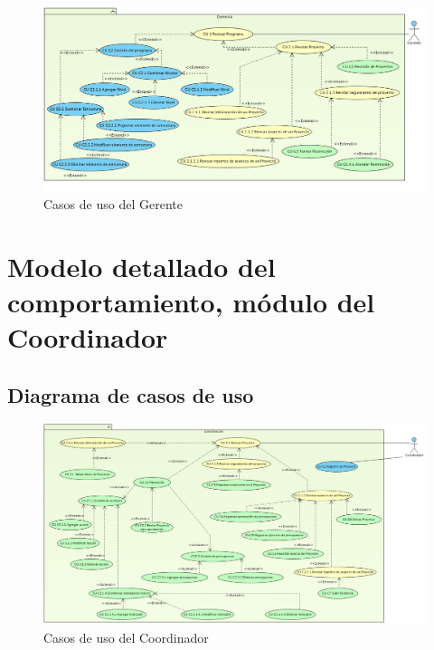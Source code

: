 \documentclass[10pt]{book}
\begin{document}
\begin{figure}[htbp!]
	\begin{center}
		\includegraphics[width=\textwidth]{images/CUgerente}
		\caption{Casos de uso del Gerente}
		\label{fig:default}
	\end{center}
\end{figure}


\chapter{Modelo detallado del comportamiento, módulo del Coordinador} 

\section{Diagrama de casos de uso}

\begin{figure}[htbp!]
	\begin{center}
		\includegraphics[width=\textwidth]{images/CUcoordinador}
		\caption{Casos de uso del Coordinador}
		\label{fig:default}
	\end{center}
\end{figure}
\end{document}
